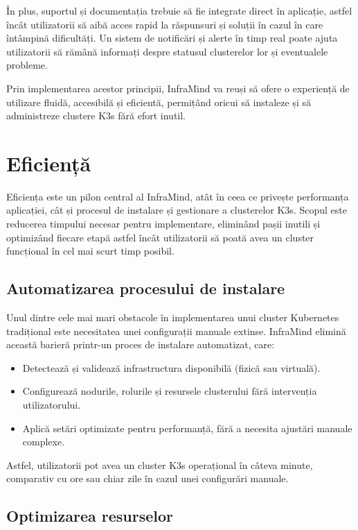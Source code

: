 \documentclass[12pt,a4paper]{report}
\begin{document}
În plus, suportul și documentația trebuie să fie integrate direct în aplicație, astfel încât utilizatorii să aibă acces rapid la răspunsuri și soluții în cazul în care întâmpină dificultăți. Un sistem de notificări și alerte în timp real poate ajuta utilizatorii să rămână informați despre statusul clusterelor lor și eventualele probleme.

Prin implementarea acestor principii, InfraMind va reuși să ofere o experiență de utilizare fluidă, accesibilă și eficientă, permițând oricui să instaleze și să administreze clustere K3s fără efort inutil.

\section{Eficiență}

Eficiența este un pilon central al InfraMind, atât în ceea ce privește performanța aplicației, cât și procesul de instalare și gestionare a clusterelor K3s. Scopul este reducerea timpului necesar pentru implementare, eliminând pașii inutili și optimizând fiecare etapă astfel încât utilizatorii să poată avea un cluster funcțional în cel mai scurt timp posibil.

\subsection{Automatizarea procesului de instalare}

Unul dintre cele mai mari obstacole în implementarea unui cluster Kubernetes tradițional este necesitatea unei configurații manuale extinse. InfraMind elimină această barieră printr-un proces de instalare automatizat, care:

\begin{itemize}
  \item Detectează și validează infrastructura disponibilă (fizică sau virtuală).
  \item Configurează nodurile, rolurile și resursele clusterului fără intervenția utilizatorului.
  \item Aplică setări optimizate pentru performanță, fără a necesita ajustări manuale complexe.
\end{itemize}

Astfel, utilizatorii pot avea un cluster K3s operațional în câteva minute, comparativ cu ore sau chiar zile în cazul unei configurări manuale.

\subsection{Optimizarea resurselor}
\end{document}

